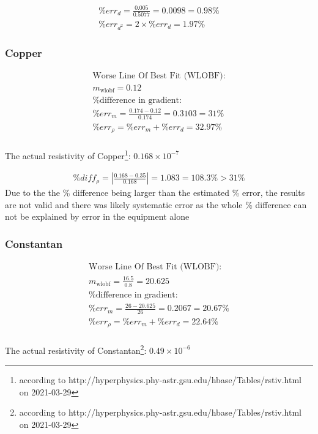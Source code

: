\documentclass{article}
\begin{document}
\begin{gather}
	\%err_d = \frac{0.005}{0.5077} = 0.0098 = 0.98\% \\
	\%err_{d^2} = 2 \times \%err_d = 1.97\%
\end{gather}

\subsubsection{Copper}

\begin{gather}
	\text{Worse Line Of Best Fit (WLOBF):} \\
	m_\text{wlobf} = 0.12 \\
	\text{\% difference in gradient:} \\
	\%err_m = \frac{0.174 - 0.12}{0.174} = 0.3103 = 31\% \\
	\%err_{\rho} = \%err_m + \%err_d = 32.97\%
\end{gather}
\\
The actual resistivity of Copper\footnote{according
to http://hyperphysics.phy-astr.gsu.edu/hbase/Tables/rstiv.html on 2021-03-29}:
$0.168 \times 10^{-7}$ 

\begin{gather}
	\%diff_{\rho} = \left | \frac{0.168 - 0.35}{0.168} \right | = 1.083 = 108.3\% > 31\%
\end{gather}
Due to the the \% difference being larger than the estimated \% error, the
results are not valid and there was likely systematic error as the whole \%
difference can not be explained by error in the equipment alone

\subsubsection{Constantan}

\begin{gather}
	\text{Worse Line Of Best Fit (WLOBF):} \\
	m_\text{wlobf} = \frac{16.5}{0.8} = 20.625 \\
	\text{\% difference in gradient:} \\
	\%err_m = \frac{26 - 20.625}{26} = 0.2067 = 20.67\% \\
	\%err_{\rho} = \%err_m + \%err_d = 22.64\%
\end{gather}
\\
The actual resistivity of Constantan\footnote{according
to http://hyperphysics.phy-astr.gsu.edu/hbase/Tables/rstiv.html on 2021-03-29}:
$0.49 \times 10^{-6}$ 
\end{document}
